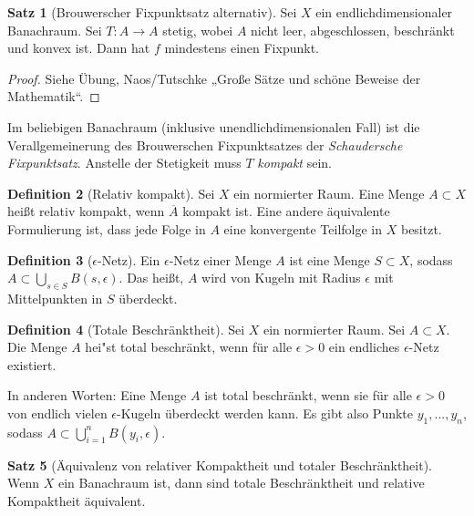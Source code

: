 \documentclass[a4paper]{article}
\theoremstyle{definition}
\newtheorem{theorem}{Satz}
\newtheorem{definition}[theorem]{Definition}
\begin{document}
\begin{theorem}[Brouwerscher Fixpunktsatz alternativ]
    Sei $X$ ein endlichdimensionaler Banachraum. Sei $T: A \to A$ stetig, wobei $A$ nicht leer, abgeschlossen, beschränkt und konvex ist. Dann hat $f$ mindestens einen Fixpunkt.
\end{theorem}

\begin{proof}
    Siehe Übung, Naos/Tutschke „Gro\ss e Sätze und schöne Beweise der Mathematik“.
\end{proof}

Im beliebigen Banachraum (inklusive unendlichdimensionalen Fall) ist die Verallgemeinerung des Brouwerschen Fixpunktsatzes der \emph{Schaudersche Fixpunktsatz}. Anstelle der Stetigkeit muss $T$ \emph{kompakt} sein.

\begin{definition}[Relativ kompakt]
    Sei $X$ ein normierter Raum. Eine Menge $A\subset X$ hei\ss t relativ kompakt, wenn $\overline A$ kompakt ist. Eine andere äquivalente Formulierung ist, dass jede Folge in $A$ eine konvergente Teilfolge in $X$ besitzt.
\end{definition}

\begin{definition}[$\epsilon$-Netz]
    Ein $\epsilon$-Netz einer Menge $A$ ist eine Menge $S \subset X$, sodass $A \subset \bigcup_{s \in S} B(s,\epsilon)$. Das heißt, $A$ wird von Kugeln mit Radius $\epsilon$ mit Mittelpunkten in $S$ überdeckt.
\end{definition}

\begin{definition}[Totale Beschränktheit]
    Sei $X$ ein normierter Raum. Sei $A \subset X$. Die Menge $A$ hei"st total beschränkt, wenn für alle $\epsilon > 0$ ein endliches $\epsilon$-Netz existiert.

    In anderen Worten: Eine Menge $A$ ist total beschränkt, wenn sie für alle $\epsilon > 0$ von endlich vielen $\epsilon$-Kugeln überdeckt werden kann. Es gibt also Punkte $y_1,...,y_n$, sodass $A \subset \bigcup_{i=1}^n B(y_i, \epsilon)$.
\end{definition}

\begin{theorem}[Äquivalenz von relativer Kompaktheit und totaler Beschränktheit]\label{theorem:relative-kompaktheit-totale-beschraenktheit}
    Wenn $X$ ein Banachraum ist, dann sind totale Beschränktheit und relative Kompaktheit äquivalent.
\end{theorem}
\end{document}
